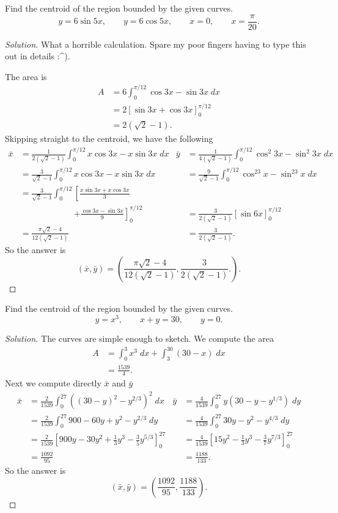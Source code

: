 \begin{problem}
Find the centroid of the region bounded by the given curves.
\[
y=6\sin 5x,\qquad
y=6\cos 5x,\qquad
x=0,\qquad
x=\frac{\pi}{20}.
\]
\end{problem}
\begin{proof}[Solution]
What a horrible calculation. Spare my poor fingers having to type this out
in details :\textasciicircum).

The area is
\begin{align*}
A&=6\int_0^{\pi/12}\cos 3x-\sin 3x\;dx\\
 &=2\left[ \sin 3x+\cos 3x \right]_0^{\pi/12}\\
 &=\boxed{2(\sqrt{2}-1).}
\end{align*}
Skipping straight to the centroid, we have the following
\begin{align*}
\bar x&=\frac{1}{2(\sqrt{2}-1)}\int_0^{\pi/12}x\cos 3x-x\sin 3x\;dx&
\bar y&=\frac{1}{4(\sqrt{2}-1)}\int_0^{\pi/12}\cos^2 3x-\sin^2 3x\;dx\\
&=\frac{3}{\sqrt{2}-1}\int_0^{\pi/12} x\cos 3x-x\sin 3x\;dx&
&=\frac{9}{\sqrt{2}-1}\int_0^{\pi/12}\cos^23x-\sin^23x\;dx\\
&=\frac{3}{\sqrt{2}-1}\int_0^{\pi/12}\left[\frac{x\sin 3x+x\cos
  3x}{3}\right.\\
&\phantom{{}=\frac{3}{\sqrt{2}-1}\int_0^{\pi/12}{}}\left.+\frac{\cos 3x-\sin 3x}{9}\right]_0^{\pi/12}&
&=\frac{3}{2(\sqrt{2}-1)}\left[ \sin 6x \right]_0^{\pi/12}\\
&=\frac{\pi\sqrt{2}-4}{12(\sqrt{2}-1)}&
&=\frac{3}{2(\sqrt{2}-1)}.
\end{align*}
So the answer is
\[
\boxed{
(\bar x,\bar y)=
\left(
\frac{\pi\sqrt{2}-4}{12(\sqrt{2}-1)},
\frac{3}{2(\sqrt{2}-1)}.
\right)
.}
\]
\end{proof}

\begin{problem}
Find the centroid of the region bounded by the given curves.
\[
y=x^3,\qquad
x+y=30,\qquad
y=0.
\]
\end{problem}
\begin{proof}[Solution]
The curves are simple enough to sketch. We compute the area
\begin{align*}
  A&=\int_0^3 x^3\;dx+\int_3^{30}(30-x)\;dx\\
   &=\frac{1539}{4}.
\end{align*}
Next we compute directly $\bar x$ and $\bar y$
\begin{align*}
\bar x&=\frac{2}{1539}\int_0^{27}\left((30-y)^2-y^{2/3}\right)^2\;dx&
\bar y&=\frac{4}{1539}\int_0^{27}y\left(30-y-y^{1/3}\right)\;dy\\
&=\frac{2}{1539}\int_0^{27}900-60y+y^2-y^{2/3}\;dy&
&=\frac{4}{1539}\int_0^{27}30y-y^2-y^{4/3}\;dy\\
&=\frac{2}{1539}\left[900y-30y^2+\tfrac{1}{3}y^3-\tfrac{3}{5}y^{5/3}\right]_0^{27}&
&=\frac{4}{1539}\left[15y^2-\tfrac{1}{3}y^3-\tfrac{3}{7}y^{7/3}\right]_0^{27}\\
&=\frac{1092}{95}&&=\frac{1188}{133}.
\end{align*}
So the answer is
\[
\boxed{(\bar x,\bar y)=
\left(
\frac{1092}{95},\frac{1188}{133}
\right).
}
\]
\end{proof}

